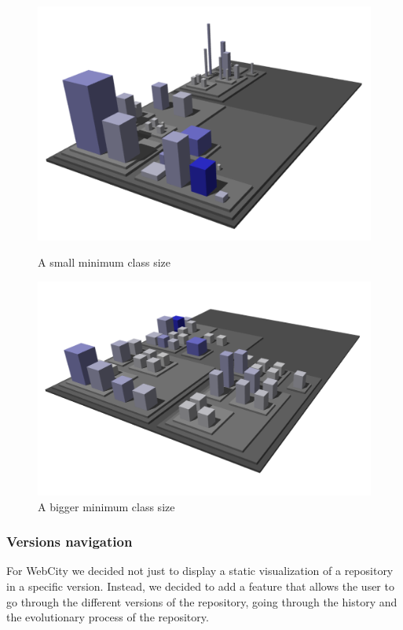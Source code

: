 \documentclass[]{usiinfbachelorproject}
\begin{document}
\begin{figure}[H]
  \centering
  \begin{minipage}[b]{0.49\textwidth}
      \includegraphics[width=1\textwidth]{pictures/small.png}
      \caption{A small minimum class size}
      \label{fig:sizes small}
  \end{minipage}
  \hfill
  \begin{minipage}[b]{0.49\textwidth}
    \includegraphics[width=1\textwidth]{pictures/big.png}
    \caption{A bigger minimum class size}
    \label{fig:sizes big}
  \end{minipage}
\end{figure}

\subsubsection{Versions navigation} \label{Version navigation}
For WebCity we decided not just to display a static visualization of a repository in a specific version. Instead, we
decided to add a feature that allows the user to go through the different versions of the repository, going through the history and the evolutionary process of the repository.
\end{document}
